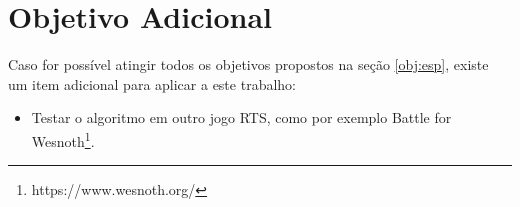 \section{Objetivo Adicional}

Caso for possível atingir todos os objetivos propostos na seção \ref{obj:esp}, existe um item adicional para aplicar a este trabalho:

\begin{itemize}
\item Testar o algoritmo em outro jogo RTS, como por exemplo Battle for Wesnoth\footnote{https://www.wesnoth.org/}.
\end{itemize}
